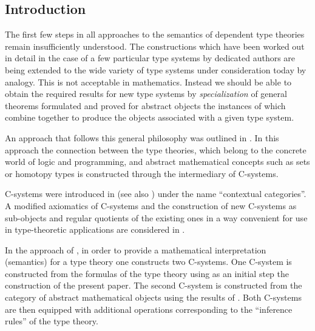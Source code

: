 \documentclass[11pt]{article}
\begin{document}
\tableofcontents

\subsection{Introduction}

The first few steps in all approaches to the semantics of dependent type theories remain insufficiently understood. The constructions which have been worked out in detail in the case of a few particular type systems by dedicated authors are being extended to the wide variety of type systems under consideration today by analogy. This is not acceptable in mathematics. Instead we should be able to obtain the required results for new type systems by {\em specialization} of general theorems formulated and proved for abstract objects the instances of which combine together to produce the objects associated with a given type system. 





An approach that follows this general philosophy was outlined in \cite{CMUtalk}. In this approach the connection between the type theories, which belong to the concrete world of logic and programming, and abstract mathematical concepts such as sets or homotopy types is constructed through the intermediary of C-systems. 

C-systems were introduced in \cite{Cartmell0} (see also \cite{Cartmell1}) under the name ``contextual categories''. A modified axiomatics of C-systems and the construction of new C-systems as sub-objects and regular quotients of the existing ones in a way convenient for use in type-theoretic applications are considered in \cite{Csubsystems}.

In the approach of \cite{CMUtalk}, in order to provide a mathematical interpretation (semantics) for a type theory one constructs two C-systems. One C-system is constructed from the formulas of the type theory using as an initial step the construction of the present paper.  The second C-system is constructed from the category of abstract mathematical objects using the results of \cite{Cfromauniverse}. Both C-systems are then equipped with additional operations corresponding to the ``inference rules'' of the type theory. 
\end{document}
